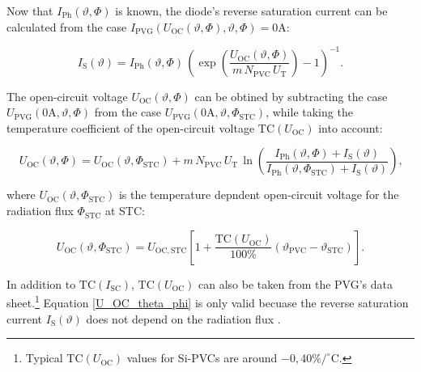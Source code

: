 Now that $I_{\mathrm{Ph}}\left( \vartheta, \Phi \right)$ is known, the diode's reverse saturation current can be calculated from the case $I_{\mathrm{PVG}}\left(U_{\mathrm{OC}}\left( \vartheta, \Phi \right), \vartheta, \Phi\right) = 0\mathrm{A}$: 
\begin{center}
	\begin{equation} \label{I_S_theta_phi}
		I_\mathrm{S}\left(\vartheta\right) = I_{\mathrm{Ph}}\left( \vartheta, \Phi \right) \, \left( \exp \left( \frac{U_\mathrm{OC}\left(\vartheta,\Phi\right)}{m \, N_\mathrm{PVC} \, U_\mathrm{T}} \right) - 1 \right)^{-1} \text{.}
	\end{equation}
\end{center}
The open-circuit voltage $U_\mathrm{OC}\left(\vartheta,\Phi\right)$ can be obtined by subtracting the case $U_{\mathrm{PVG}}\left( 0\mathrm{A}, \vartheta, \Phi \right)$ from the case $U_{\mathrm{PVG}}\left(0\mathrm{A}, \vartheta, \Phi_{\mathrm{STC}}\right)$, while taking the temperature coefficient of the open-circuit voltage $\mathrm{TC}\left(U_{\mathrm{OC}}\right)$ into account:
\begin{center}
	\begin{equation} \label{U_OC_theta_phi}
		U_\mathrm{OC}\left(\vartheta,\Phi\right) = U_\mathrm{OC}\left(\vartheta,\Phi_\mathrm{STC}\right)  + m \, N_\mathrm{PVC} \, U_\mathrm{T} \, \ln \left( \frac{I_{\mathrm{Ph}}\left(\vartheta, \Phi \right) + I_{\mathrm{S}}\left( \vartheta\right)}{I_\mathrm{Ph}\left(\vartheta,\Phi_\mathrm{STC}\right) + I_{\mathrm{S}}\left( \vartheta\right)} \right) \text{,}
	\end{equation}
\end{center}
where $U_\mathrm{OC}\left(\vartheta,\Phi_\mathrm{STC}\right)$ is the temperature depndent open-circuit voltage for the radiation flux $\Phi_\mathrm{STC}$ at STC: 
\begin{center}
	\begin{equation} \label{U_OC_phi_STC}
		U_\mathrm{OC}\left(\vartheta,\Phi_\mathrm{STC}\right) = U_\mathrm{OC,STC} \left[ 1 + \frac{\mathrm{TC}\left(U_{\mathrm{OC}}\right)}{100\%} \left(\vartheta_{\mathrm{PVC}} - \vartheta_{\mathrm{STC}} \right) \right] \text{.}
	\end{equation}
\end{center}
In addition to $\mathrm{TC}\left(I_{\mathrm{SC}}\right)$, $\mathrm{TC}\left(U_{\mathrm{OC}}\right)$ can also be taken from the PVG's data sheet.\footnote{Typical $\mathrm{TC}\left(U_{\mathrm{OC}}\right)$ values for Si-PVCs are around $-0,40 \% / ^\circ \mathrm{C}$.} Equation \ref{U_OC_theta_phi} is only valid becuase the reverse saturation current $I_\mathrm{S}\left(\vartheta\right)$ does not depend on the radiation flux \cite{Mertens:2015, Tietze:2016, Hering:2017, Wagner:2018}. 

